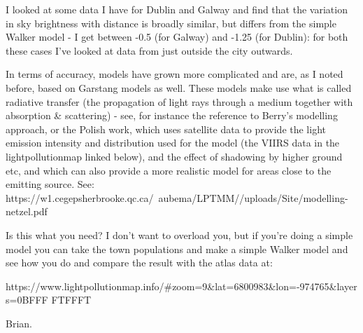 \begin{appendix}
I looked at some data I have for Dublin and Galway and find that the variation in sky brightness with distance is broadly similar, but differs from the simple Walker model - I get between -0.5 (for Galway) and -1.25 (for Dublin): for both these cases I've looked at data from just outside the city outwards.

In terms of accuracy, models have grown more complicated and are, as I noted before, based on Garstang models as well. These models make use what is called radiative transfer (the propagation of light rays through a medium together with absorption \& scattering) - see, for instance the reference to Berry's modelling approach, or the Polish work, which uses satellite data to provide the light emission intensity and distribution used for the model (the VIIRS data in the lightpollutionmap linked below), and the effect of shadowing by higher ground etc, and which can also provide a more realistic model for areas close to the emitting source. See: https://w1.cegepsherbrooke.qc.ca/~aubema/LPTMM//uploads/Site/modelling-netzel.pdf

Is this what you need? I don't want to overload you, but if you're doing a simple model you can take the town populations and make a simple Walker model and see how you do and compare the result with the atlas data at:

https://www.lightpollutionmap.info/\#zoom=9\&lat=6800983\&lon=-974765\&layers=0BFFF
FTFFFT

Brian.
\end{appendix}